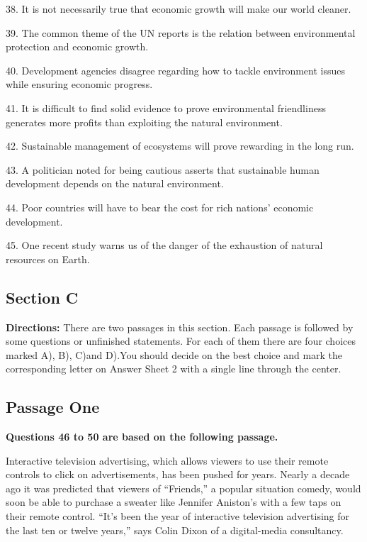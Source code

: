 \documentclass[UTF8,11pt]{ctexart}
\begin{document}
38. It is not necessarily true that economic growth will make our world cleaner.


39. The common theme of the UN reports is the relation between environmental protection and economic growth.


40. Development agencies disagree regarding how to tackle environment issues while ensuring economic progress.


41. It is difficult to find solid evidence to prove environmental friendliness generates more profits than exploiting the natural environment.


42. Sustainable management of ecosystems will prove rewarding in the long run.


43. A politician noted for being cautious asserts that sustainable human development depends on the natural environment.


44. Poor countries will have to bear the cost for rich nations’ economic development.


45. One recent study warns us of the danger of the exhaustion of natural resources on Earth.


\subsection*{\textbf{Section C}}


\textbf{Directions:} There are two passages in this section. Each passage is followed by some questions or unfinished statements. For each of them there are four choices marked A), B), C)and D).You should decide on the best choice and mark the corresponding letter on Answer Sheet 2 with a single line through the center.


\subsection*{\textbf{Passage One}}


\textbf{Questions 46 to 50 are based on the following passage.}


Interactive television advertising, which allows viewers to use their remote controls to click on advertisements, has been pushed for years. Nearly a decade ago it was predicted that viewers of “Friends,” a popular situation comedy, would soon be able to purchase a sweater like Jennifer Aniston’s with a few taps on their remote control. “It’s been the year of interactive television advertising for the last ten or twelve years,” says Colin Dixon of a digital-media consultancy.
\end{document}

